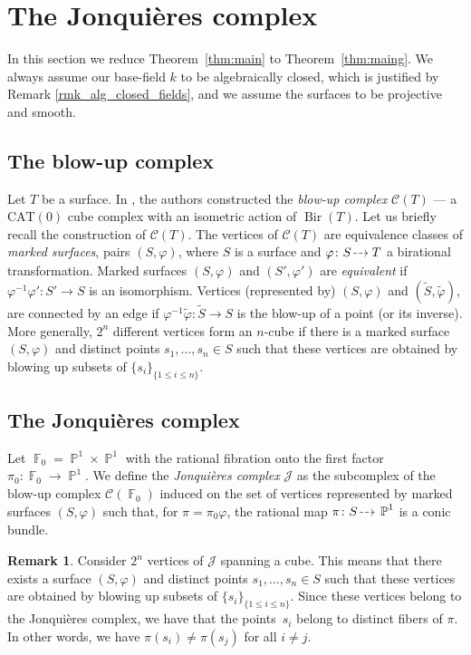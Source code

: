 \documentclass[JEP,XML,SOM,Unicode, NoEqCountersInSection,published]{cedram}
\newcommand{\dradpl}{{\hspace*{-2.5mm}\begin{tikzcd}[ampersand replacement=\&,column sep = scriptsize]\mbox{}\ar[r,dashed]\&\mbox{}\end{tikzcd}\hspace*{-2.5mm}}}
\newcommand{\dratst}{{\hspace*{-2.5mm}\begin{tikzcd}[ampersand replacement=\&,column sep = small]\mbox{}\ar[r,dashed]\&\mbox{}\end{tikzcd}\hspace*{-2mm}}}
\let\drascst\dratst
\newcommand{\dra}{\mathchoice{\dradpl}{\dratst}{\drascst}{\drascst}}
\let\dashrightarrow\dra
\newcommand{\CAT}{\mathrm{CAT}}
\newcommand{\p}{\operatorname{\mathbb{P}}}\let\P\p
\newcommand{\F}{\operatorname{\mathbb{F}}}
\newcommand{\Bir}{\operatorname{Bir}}
\newcommand{\CC}{\mathcal{C}}
\theoremstyle{plain}
\theoremstyle{definition}
\newtheorem{remark}[theorem]{Remark}
\begin{document}
\section{The Jonquières complex}
\label{sec:Jon}
In this section we reduce Theorem~\ref{thm:main} to Theorem~\ref{thm:maing}. We always assume our base-field $k$ to be algebraically closed, {which is justified by Remark \ref{rmk_alg_closed_fields}, and we assume the} surfaces to be projective and smooth.

\subsection{The blow-up complex}
Let $T$ be a
surface. In \cite{lonjou2021actions}, the authors constructed the \emph{blow-up complex} $\CC(T)$ --- a $\CAT(0)$ cube complex with an isometric action of $\Bir(T)$. Let us briefly recall the construction of $\CC(T)$. The vertices of $\CC(T)$ are equivalence classes of \emph{marked surfaces}, \ie pairs $(S,\varphi)$, where $S$ is a
surface and $\varphi\colon S\dashrightarrow T$ a birational transformation. Marked surfaces $(S,\varphi)$ and $(S',\varphi')$ are \emph{equivalent} if $\varphi^{-1}\varphi'\colon S'\to S$ is an isomorphism.
Vertices (represented by) $(S,\varphi)$ and $(\tilde{S},\tilde{\varphi})$, are connected by an edge if ${\varphi}^{-1}\tilde \varphi\colon \tilde S\to {S}$ is the blow-up of a point (or its inverse). More generally, $2^n$ different vertices form an $n$-cube if there is a marked surface $(S,\varphi)$ and distinct points $s_1,\dots, s_n\in S$ such that these vertices are obtained by blowing up subsets of $\{s_i\}_{\{1\leq i \leq n\}}$.

\subsection{The Jonquières complex}
Let $\F_0=\p^1\times\p^1$ with the rational fibration onto the first factor $\pi_0\colon \F_0\to\p^1$. We define the \emph{Jonquières complex} $\mathscr{J}$ as the subcomplex of the blow-up complex $\mathcal C(\F_0)$ induced on the set of vertices represented by marked surfaces $(S,\varphi)$ such that, for $\pi=\pi_0\varphi$, the rational map
$\pi\colon S\dashrightarrow\p^1$ is a conic bundle.

\begin{remark}\label{remark_cube_Jonquièrescplx}
Consider $2^n$ vertices of $\mathscr{J}$ spanning a cube. This means that there exists a surface $(S,\varphi)$ and distinct points $s_1,\dots, s_n\in S$ such that these vertices are obtained by blowing up subsets of $\{s_i\}_{\{1\leq i \leq n\}}$. Since these vertices belong to the Jonquières complex, we have that the points~$s_i$ belong to distinct fibers of $\pi$. In other words, we have $\pi(s_i)\neq\pi(s_j)$ for all $i\neq j$.
\end{remark}
\end{document}
